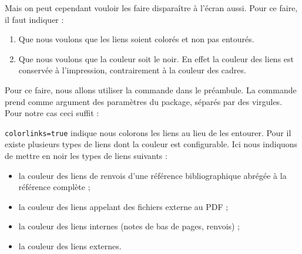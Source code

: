 Mais on peut cependant vouloir les faire disparaître à l'écran aussi. Pour ce faire, il faut indiquer :
\begin{enumerate}
\item Que nous voulons que les liens soient colorés et non pas entourés.
\item Que nous voulons que la couleur soit le noir. En effet la couleur des liens est conservée à l'impression, contrairement à la couleur des cadres.
\end{enumerate}

Pour ce faire, nous allons utiliser la commande  dans le préambule. La commande prend comme argument des paramètres du package, séparés par des virgules.
Pour notre cas ceci suffit :

\begin{latexcode}
\hypersetup{colorlinks=true,
citecolor=black,
filecolor=black,
linkcolor=black,
urlcolor=black,
\end{latexcode}

\verb|colorlinks=true| indique nous colorons les liens au lieu de les entourer. Pour  il existe plusieurs types de liens dont la couleur est configurable. Ici nous indiquons de mettre en noir les types de liens suivants  :\begin{itemize}
\item la couleur des liens de renvois d'une référence bibliographique abrégée à la référence complète ;
\item la couleur des liens appelant des fichiers externe au PDF ;
\item la couleur des liens internes (notes de bas de pages, renvois) ;
\item la couleur des liens externes.
\end{itemize}
